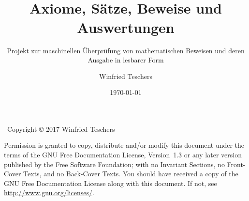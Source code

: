 \titlehead{
	{\Large Dr. Winfried Teschers}\\
	Anton-Günther-Straße 26c\\91083 Baiersdorf\\
	{\footnotesize winfried.teschers@t-online.de}
}
\subject{Projektdokument}
\title{{\Huge \ASBA}\\Axiome, Sätze, Beweise und Auswertungen}
\subtitle{Projekt zur maschinellen Überprüfung von mathematischen Beweisen und deren Ausgabe in lesbarer Form}
\author{Winfried Teschers}
\date{\today}
\publishers{\vspace{1cm}\normalsize
	Es wird ein Programmsystem beschrieben, das zu eingegebenen Axiomen, Sätzen, und Beweisen letztere prüft, Auswertungen generiert und zu gegebenen Ausgabeschemata eine Ausgabe der Elemente in üblicher Formelschreibweise im \LaTeX-Format erstellt.
}



	\maketitle

	~\vfill Copyright \copyright{} 2017 Winfried Teschers\bigskip

	Permission is granted to copy, distribute and/or modify this document under the terms of the GNU Free Documentation License, Version~1.3 or any later version published by the Free Software Foundation; with no Invariant Sections, no Front-Cover Texts, and no Back-Cover Texts.
	You should have received a copy of the GNU Free Documentation License along with this document.
	If not, see \url{http://www.gnu.org/licenses/}.

	\beforechapter
	\likechapter{\contentsname}
	\label{cha:Inhaltsverzeichnis}
	\tableofcontents
	\Endchapter

	
	
	
	
	

	\beforechapter
	\Endchapter

	\likechapter[section]{\listtablename}
	\label{dic:Tabellenverzeichnis}
	\listoftables
	\Thispagestyle%

